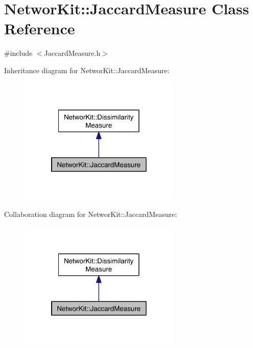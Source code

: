 \hypertarget{class_networ_kit_1_1_jaccard_measure}{\section{Networ\-Kit\-:\-:Jaccard\-Measure Class Reference}
\label{class_networ_kit_1_1_jaccard_measure}
}


{\ttfamily \#include $<$Jaccard\-Measure.\-h$>$}



Inheritance diagram for Networ\-Kit\-:\-:Jaccard\-Measure\-:\nopagebreak
\begin{figure}[H]
\begin{center}
\leavevmode
\includegraphics[width=218pt]{class_networ_kit_1_1_jaccard_measure__inherit__graph}
\end{center}
\end{figure}


Collaboration diagram for Networ\-Kit\-:\-:Jaccard\-Measure\-:\nopagebreak
\begin{figure}[H]
\begin{center}
\leavevmode
\includegraphics[width=218pt]{class_networ_kit_1_1_jaccard_measure__coll__graph}
\end{center}
\end{figure}
